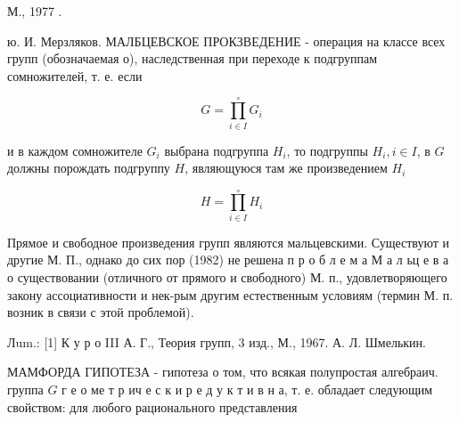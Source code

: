 \documentclass[10pt]{article}
\begin{document}
М., 1977 .

ю. И. Мерзляков. МАЛБЦЕВСКОЕ ПРОКЗВЕДЕНИЕ - операция на классе всех групп (обозначаемая о), наследственная при переходе к подгруппам сомножителей, т. е. если



\[

G=\prod_{i \in I}^{\circ} G_{i}

\]



и в каждом сомножителе $G_{i}$ выбрана подгруппа $H_{i}$, то подгруппы $H_{i}, i \in I$, в $G$ должны порождать подгруппу $H$, являющуюся там же произведением $H_{i}$



\[

H=\prod_{i \in I}^{\circ} H_{i}

\]



Прямое и свободное произведения групп являются мальцевскими. Существуют и другие М. П., однако до сих пор (1982) не решена п р о б л е м а М а л ьц е в а о существовании (отличного от прямого и свободного) М. п., удовлетворяющего закону ассоциативности и нек-рым другим естественным условиям (термин М. п. возник в связи с этой проблемой).



Лum.: [1] К у р о III А. Г., Теория групп, 3 изд., М., 1967. А. Л. Шмелькин.



МАМФОРДА ГИПОТЕЗА - гипотеза о том, что всякая полупростая алгебраич. группа $G$ г е о ме т р ич е с к и р е д у к т и в н а, т. е. обладает следующим свойством: для любого рационального представления
\end{document}
